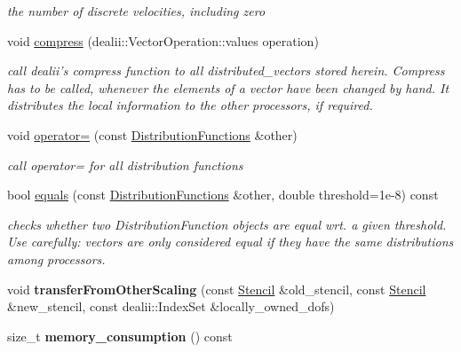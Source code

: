 \begin{DoxyCompactItemize}
\begin{DoxyCompactList}\small\item\em the number of discrete velocities, including zero \item\end{DoxyCompactList}\item 
void \hyperlink{classnatrium_1_1DistributionFunctions_a5b0afbafe841922dd3f949cc315b5533}{compress} (dealii::VectorOperation::values operation)
\begin{DoxyCompactList}\small\item\em call dealii's compress function to all distributed\_\-vectors stored herein. Compress has to be called, whenever the elements of a vector have been changed by hand. It distributes the local information to the other processors, if required. \item\end{DoxyCompactList}\item 
void \hyperlink{classnatrium_1_1DistributionFunctions_a5e61cb3ba258cf0958e1557061ed31b9}{operator=} (const \hyperlink{classnatrium_1_1DistributionFunctions}{DistributionFunctions} \&other)
\begin{DoxyCompactList}\small\item\em call operator= for all distribution functions \item\end{DoxyCompactList}\item 
bool \hyperlink{classnatrium_1_1DistributionFunctions_af7132264087f7000ffe8b191210b4552}{equals} (const \hyperlink{classnatrium_1_1DistributionFunctions}{DistributionFunctions} \&other, double threshold=1e-\/8) const 
\begin{DoxyCompactList}\small\item\em checks whether two DistributionFunction objects are equal wrt. a given threshold. Use carefully: vectors are only considered equal if they have the same distributions among processors. \item\end{DoxyCompactList}\item 
\hypertarget{classnatrium_1_1DistributionFunctions_a337f35635db75aaecfc7dde998e3321d}{
void {\bfseries transferFromOtherScaling} (const \hyperlink{classnatrium_1_1Stencil}{Stencil} \&old\_\-stencil, const \hyperlink{classnatrium_1_1Stencil}{Stencil} \&new\_\-stencil, const dealii::IndexSet \&locally\_\-owned\_\-dofs)}
\label{classnatrium_1_1DistributionFunctions_a337f35635db75aaecfc7dde998e3321d}

\item 
\hypertarget{classnatrium_1_1DistributionFunctions_a3942c2287df5372698ca987288a902e8}{
size\_\-t {\bfseries memory\_\-consumption} () const }
\label{classnatrium_1_1DistributionFunctions_a3942c2287df5372698ca987288a902e8}


\end{DoxyCompactItemize}
